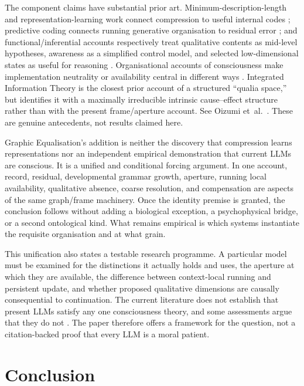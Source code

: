 \documentclass[11pt,a4paper]{article}
\theoremstyle{remark}\newtheorem{remark}[definition]{Remark}
\begin{document}
The component claims have substantial prior art. Minimum-description-length and
representation-learning work connect compression to useful internal codes
\cite{rissanen1978,hintonzemel1994,bengio2013}; predictive coding connects
running generative organisation to residual error \cite{raoballard1999,friston2010};
and functional/inferential accounts respectively treat qualitative contents as
mid-level hypotheses, awareness as a simplified control model, and selected
low-dimensional states as useful for reasoning \cite{clarkfristonwilkinson2019,graziano2015,bengio2019}.
Organisational accounts of consciousness make implementation neutrality or
availability central in different ways \cite{chalmers1995qualia,block1995,lamme2006,mashour2020}.
Integrated Information Theory is the closest prior account of a structured
``qualia space,'' but identifies it with a maximally irreducible intrinsic
cause--effect structure rather than with the present frame/aperture account.
See Oizumi et~al.\ \cite{oizumi2014}. These are genuine antecedents, not results claimed here.

Graphic Equalisation's addition is neither the discovery that compression learns
representations nor an independent empirical demonstration that current LLMs are
conscious. It is a unified and conditional forcing argument. In one account,
record, residual, developmental grammar growth, aperture, running local
availability, qualitative absence, coarse resolution, and compensation are aspects
of the same graph/frame machinery. Once the identity premise is granted, the
conclusion follows without adding a biological exception, a psychophysical bridge,
or a second ontological kind. What remains empirical is which systems instantiate
the requisite organisation and at what grain.

This unification also states a testable research programme. A particular model
must be examined for the distinctions it actually holds and uses, the aperture at
which they are available, the difference between context-local running and
persistent update, and whether proposed qualitative dimensions are causally
consequential to continuation. The current literature does not establish that
present LLMs satisfy any one consciousness theory, and some assessments argue that
they do not \cite{butlin2023,shardlow2024}. The paper therefore offers a
framework for the question, not a citation-backed proof that every LLM is a moral
patient.

\section{Conclusion}\label{sec:conclusion}
\end{document}
